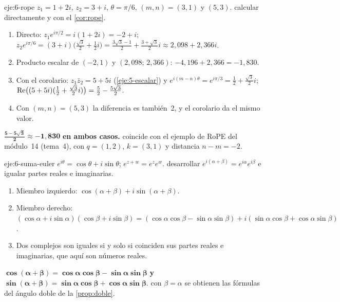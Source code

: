 \begin{solucion}{eje:6-rope}
\datos $z_1=1+2i$, $z_2=3+i$, $\theta=\pi/6$, $(m,n)=(3,1)$ y $(5,3)$.
\planteamiento calcular directamente y con el \cref{cor:rope}.
\pasos
\begin{enumerate}[label=\arabic*.]
  \item Directo: $z_1e^{i\pi/2}=i(1+2i)=-2+i$; $z_2e^{i\pi/6}=(3+i)\bigl(\frac{\sqrt3}{2}+\frac12i\bigr)=\frac{3\sqrt3-1}{2}+\frac{3+\sqrt3}{2}i\approx2{,}098+2{,}366i$.
  \item Producto escalar de $(-2,1)$ y $(2{,}098;\,2{,}366)$: $-4{,}196+2{,}366=-1{,}830$.
  \item Con el corolario: $z_1\bar z_2=5+5i$ (\cref{eje:5-escalar}) y $e^{i(m-n)\theta}=e^{i\pi/3}=\frac12+\frac{\sqrt3}{2}i$; $\operatorname{Re}\bigl((5+5i)(\frac12+\frac{\sqrt3}{2}i)\bigr)=\frac52-\frac{5\sqrt3}{2}$.
  \item Con $(m,n)=(5,3)$ la diferencia es también~2, y el corolario da el mismo valor.
\end{enumerate}
\resultado $\mathbf{\frac{5-5\sqrt3}{2}\approx-1{,}830}$ \textbf{en ambos casos.}
\comprobacion coincide con el ejemplo de RoPE del módulo~14 (tema~4), con $q=(1,2)$, $k=(3,1)$ y distancia $n-m=-2$.
\end{solucion}

\begin{solucion}{eje:6-suma-euler}
\datos $e^{i\theta}=\cos\theta+i\sin\theta$; $e^{z+w}=e^{z}e^{w}$.
\planteamiento desarrollar $e^{i(\alpha+\beta)}=e^{i\alpha}e^{i\beta}$ e igualar partes reales e imaginarias.
\pasos
\begin{enumerate}[label=\arabic*.]
  \item Miembro izquierdo: $\cos(\alpha+\beta)+i\sin(\alpha+\beta)$.
  \item Miembro derecho: $(\cos\alpha+i\sin\alpha)(\cos\beta+i\sin\beta)=(\cos\alpha\cos\beta-\sin\alpha\sin\beta)+i(\sin\alpha\cos\beta+\cos\alpha\sin\beta)$.
  \item Dos complejos son iguales si y solo si coinciden sus partes reales e imaginarias, que aquí son números reales.
\end{enumerate}
\resultado $\mathbf{\cos(\alpha+\beta)=\cos\alpha\cos\beta-\sin\alpha\sin\beta}$ \textbf{y} $\mathbf{\sin(\alpha+\beta)=\sin\alpha\cos\beta+\cos\alpha\sin\beta}$.
\comprobacion con $\beta=\alpha$ se obtienen las fórmulas del ángulo doble de la \cref{prop:doble}.
\end{solucion}

